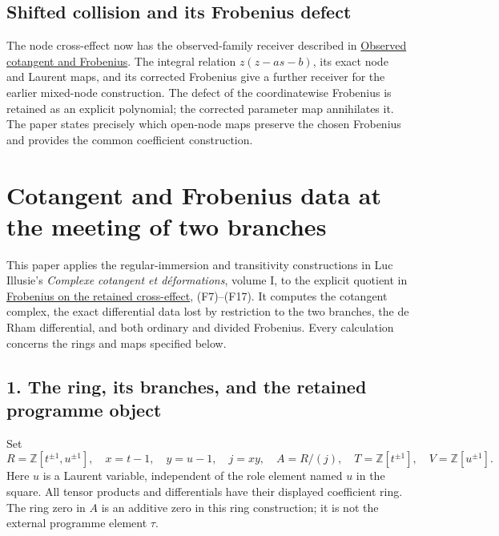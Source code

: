 \documentclass[
]{article}
\begin{document}
\subsection{Shifted collision and its Frobenius
defect}\label{shifted-collision-and-its-frobenius-defect}

The node cross-effect now has the observed-family receiver described in
\href{https://github.com/KokunoYumeto/zeta-function-research-reader/blob/c9df443d9e1df000dfbb083943f97197e746eb08/workbenches/splitzero-tandem/branches/identity-absorber-square/OBSERVED_COTANGENT_FROBENIUS.md}{Observed
cotangent and Frobenius}. The integral relation \(z(z-as-b)\), its exact
node and Laurent maps, and its corrected Frobenius give a further
receiver for the earlier mixed-node construction. The defect of the
coordinatewise Frobenius is retained as an explicit polynomial; the
corrected parameter map annihilates it. The paper states precisely which
open-node maps preserve the chosen Frobenius and provides the common
coefficient construction.

\section{Cotangent and Frobenius data at the meeting of two
branches}\label{cotangent-and-frobenius-data-at-the-meeting-of-two-branches}

This paper applies the regular-immersion and transitivity constructions
in Luc Illusie's \emph{Complexe cotangent et déformations}, volume I, to
the explicit quotient in
\href{https://github.com/KokunoYumeto/zeta-function-research-reader/blob/6af54ea3c8ef99127af327f3103e086c68d482c2/workbenches/splitzero-tandem/branches/identity-absorber-square/FROBENIUS_CROSS_EFFECT.md}{Frobenius
on the retained cross-effect}, (F7)--(F17). It computes the cotangent
complex, the exact differential data lost by restriction to the two
branches, the de Rham differential, and both ordinary and divided
Frobenius. Every calculation concerns the rings and maps specified
below.

\subsection{1. The ring, its branches, and the retained programme
object}\label{the-ring-its-branches-and-the-retained-programme-object}

Set \[
R=\mathbb Z[t^{\pm1},u^{\pm1}],\quad x=t-1,\quad y=u-1,
\quad j=xy,\quad A=R/(j),
\quad T=\mathbb Z[t^{\pm1}],\quad V=\mathbb Z[u^{\pm1}].
\tag{N1}
\] Here \(u\) is a Laurent variable, independent of the role element
named \(u\) in the square. All tensor products and differentials have
their displayed coefficient ring. The ring zero in \(A\) is an additive
zero in this ring construction; it is not the external programme element
\(\tau\).
\end{document}
